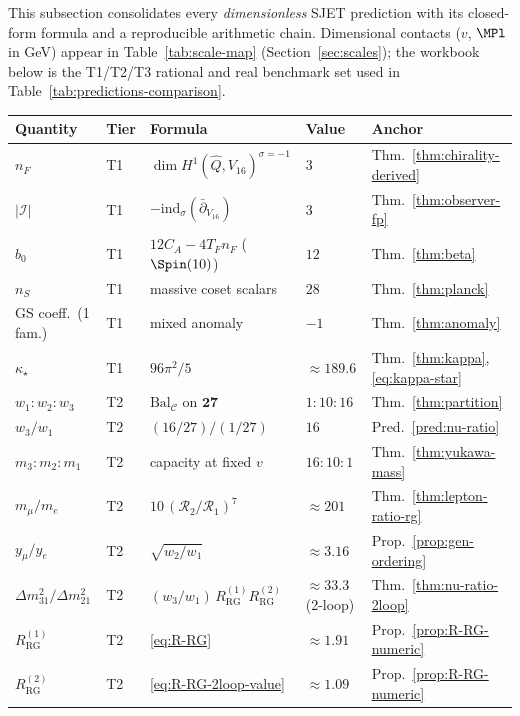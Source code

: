 This subsection consolidates every \emph{dimensionless} SJET prediction with
its closed-form formula and a reproducible arithmetic chain. Dimensional
contacts ($v$, $\MPl$ in GeV) appear in Table~\ref{tab:scale-map}
(Section~\ref{sec:scales}); the workbook below is the T1/T2/T3 rational and
real benchmark set used in Table~\ref{tab:predictions-comparison}.

\begin{table}[ht]
\centering
\small
\renewcommand{\arraystretch}{1.14}
\begin{tabular}{@{}lllll@{}}
\toprule
\textbf{Quantity} & \textbf{Tier} & \textbf{Formula} & \textbf{Value} &
\textbf{Anchor} \\
\midrule
$n_F$ & T1 & $\dim H^1(\hat Q,V_{16})^{\sigma=-1}$ & $3$ &
Thm.~\ref{thm:chirality-derived} \\
$|\mathcal{I}|$ & T1 & $-\mathrm{ind}_\sigma(\bar\partial_{V_{16}})$ & $3$ &
Thm.~\ref{thm:observer-fp} \\
$b_0$ & T1 & $12C_A-4T_Fn_F$ ($\Spin(10)$) & $12$ &
Thm.~\ref{thm:beta} \\
$n_S$ & T1 & massive coset scalars & $28$ &
Thm.~\ref{thm:planck} \\
GS coeff.\ (1 fam.) & T1 & mixed anomaly & $-1$ &
Thm.~\ref{thm:anomaly} \\
$\kappa_\star$ & T1 & $96\pi^2/5$ & $\approx 189.6$ &
Thm.~\ref{thm:kappa}, \eqref{eq:kappa-star} \\
$w_1:w_2:w_3$ & T2 & $\mathrm{Bal}_{\mathcal{C}}$ on $\mathbf{27}$ &
$1:10:16$ &
Thm.~\ref{thm:partition} \\
$w_3/w_1$ & T2 & $(16/27)/(1/27)$ & $16$ &
Pred.~\ref{pred:nu-ratio} \\
$m_3:m_2:m_1$ & T2 & capacity at fixed $v$ & $16:10:1$ &
Thm.~\ref{thm:yukawa-mass} \\
$m_\mu/m_e$ & T2 & $10\,(\mathcal{R}_2/\mathcal{R}_1)^7$ & $\approx 201$ &
Thm.~\ref{thm:lepton-ratio-rg} \\
$y_\mu/y_e$ & T2 & $\sqrt{w_2/w_1}$ & $\approx 3.16$ &
Prop.~\ref{prop:gen-ordering} \\
$\Delta m^2_{31}/\Delta m^2_{21}$ & T2 &
$(w_3/w_1)\,R_{\mathrm{RG}}^{(1)}R_{\mathrm{RG}}^{(2)}$ &
$\approx 33.3$ (2-loop) &
Thm.~\ref{thm:nu-ratio-2loop} \\
$R_{\mathrm{RG}}^{(1)}$ & T2 & \eqref{eq:R-RG} & $\approx 1.91$ &
Prop.~\ref{prop:R-RG-numeric} \\
$R_{\mathrm{RG}}^{(2)}$ & T2 & \eqref{eq:R-RG-2loop-value} & $\approx 1.09$ &
Prop.~\ref{prop:R-RG-numeric} \\

\end{tabular}
\end{table}
